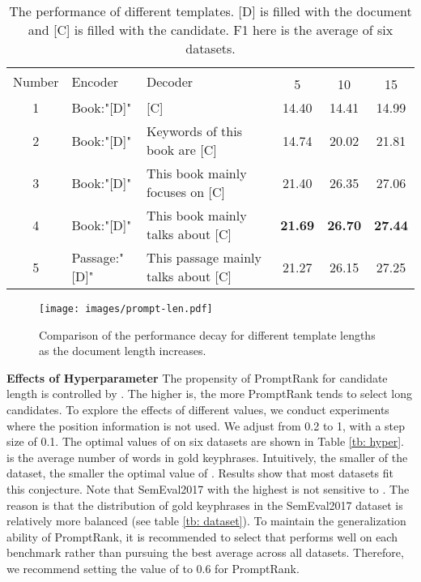 \documentclass[11pt]{article}
\begin{document}
\begin{table*}
\centering
{}
\begin{tabular}{cllccc} 
\toprule
\multirow{2}{*}{Number} & \multirow{2}{*}{Encoder} & \multirow{2}{*}{Decoder}               & \multicolumn{3}{c}{}  \\ 
\cline{4-6}
                        &                          &                                        & 5     & 10    & 15        \\ 
\midrule
1                       & Book:"[D]"               & {[}C]                                  & 14.40 & 14.41 & 14.99     \\
2                       & Book:"[D]"               & Keywords of this book are [C]          & 14.74 & 20.02 & 21.81     \\
3                       & Book:"[D]"               & This book mainly focuses on [C] & 21.40 & 26.35 & 27.06     \\
4                       & Book:"[D]"               & This book mainly talks about [C]       &\textbf{21.69} & \textbf{26.70} & \textbf{27.44}     \\
5                       & Passage:"[D]"           & This passage mainly talks about [C]    & 21.27 & 26.15 & 27.25     \\
\bottomrule
\end{tabular}
\caption{The performance of different templates. [D] is filled with the document and [C] is filled with the candidate. F1 here is the average of six datasets.}
\label{tb: prompt}
\end{table*}

\begin{figure}[t]
\centerline{\texttt{[image: images/prompt-len.pdf]}}
\caption{Comparison of the performance decay for different template lengths as the document length increases.} 
\label{fg: template-len}
\end{figure}

\noindent
{\bf Effects of Hyperparameter } The propensity of PromptRank for candidate length is controlled by . The higher  is, the more PromptRank tends to select long candidates. To explore the effects of different  values, we conduct experiments where the position information is not used. We adjust  from 0.2 to 1, with a step size of 0.1. The optimal values of  on six datasets are shown in Table \ref{tb: hyper}.  is the average number of words in gold keyphrases. Intuitively, the smaller  of the dataset, the smaller the optimal value of . Results show that most datasets fit this conjecture. Note that SemEval2017 with the highest  is not sensitive to . The reason is that the distribution of gold keyphrases in the SemEval2017 dataset is relatively more balanced (see table \ref{tb: dataset}). To maintain the generalization ability of PromptRank, it is recommended to select  that performs well on each benchmark rather than pursuing the best average  across all datasets. Therefore, we recommend setting the value of  to 0.6 for PromptRank.
\end{document}
